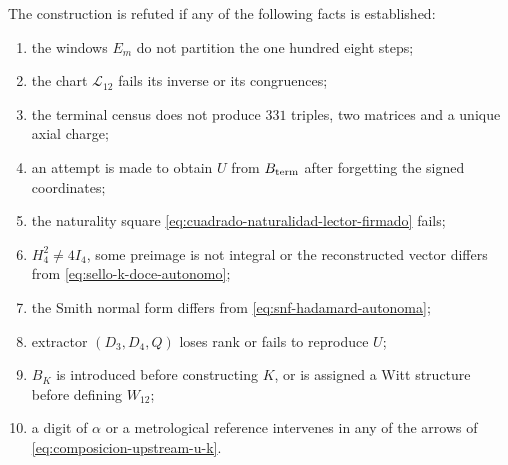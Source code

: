 \begin{criterion}
The construction is refuted if any of the following facts
is established:
\begin{enumerate}
 \item the windows \(E_m\) do not partition the one hundred eight steps;
 \item the chart \(\mathcal L_{12}\) fails its inverse or its congruences;
 \item the terminal census does not produce \(331\) triples, two matrices and a unique
       axial charge;
 \item an attempt is made to obtain \(U\) from \(B_{\rm term}\) after forgetting the
       signed coordinates;
 \item the naturality square
       \eqref{eq:cuadrado-naturalidad-lector-firmado} fails;
 \item \(H_4^2\neq4I_4\), some preimage is not integral or the
       reconstructed vector differs from \eqref{eq:sello-k-doce-autonomo};
 \item the Smith normal form differs from
       \eqref{eq:snf-hadamard-autonoma};
 \item extractor \((D_3,D_4,Q)\) loses rank or fails to reproduce \(U\);
 \item \(B_K\) is introduced before constructing \(K\), or is assigned a
       Witt structure before defining \(W_{12}\);
 \item a digit of \(\alpha\) or a metrological reference intervenes in
       any of the arrows of \eqref{eq:composicion-upstream-u-k}.
\end{enumerate}
\end{criterion}
